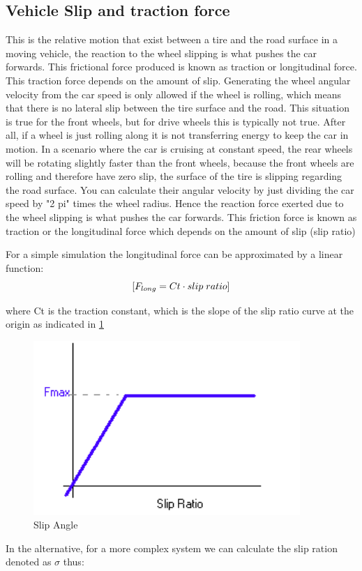 \documentclass{book}
\begin{document}
\subsection{Vehicle Slip and traction force}
This is the relative motion that exist between a tire and the road surface in a moving vehicle, the reaction to the wheel slipping  is what pushes the car forwards.  This frictional force produced is known as traction or longitudinal force.  This traction force depends on the amount of slip. Generating the wheel angular velocity from the car speed is only allowed if the wheel is rolling, which means that there is no lateral slip between the tire surface and the road.  This situation is true for the front wheels, but for drive wheels this is typically not true. After all, if a wheel is just rolling along it is not transferring energy to keep the car in motion. In a scenario where the car is cruising at constant speed, the rear wheels will be rotating slightly faster than the front wheels, because the front wheels are rolling and therefore have zero slip, the surface of the tire is slipping regarding the road surface. You can calculate their angular velocity by just dividing the car speed by "2 pi" times the wheel radius.   Hence the reaction force exerted due to the wheel slipping is what pushes the car forwards.  This friction force is known as traction or the longitudinal force which depends on the amount of slip (slip ratio)

For a simple simulation the longitudinal force can be approximated by a linear function:
\begin{equation}
\mbox[{F_{long}} = Ct \cdot slip \; ratio]
\end{equation}

where Ct is the traction constant, which is the slope of the slip ratio curve at the origin as indicated in \ref{fig:SlipAngle}\\
\begin{figure}[htbp]
  \centering
  \includegraphics[width=0.9\textwidth]{Capture}
  \caption{Slip Angle}
  \label{fig:SlipAngle}
\end{figure}
In the alternative, for a more complex system we can calculate the slip ration denoted as $\sigma$ thus:\\
\end{document}

